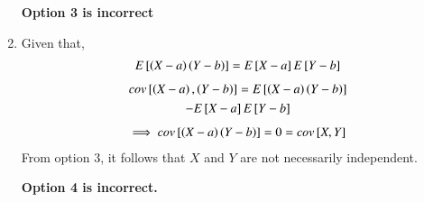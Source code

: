 \documentclass[journal,12pt,twocolumn]{IEEEtran}
\begin{document}
\begin{enumerate}
    \textbf{Option 3 is incorrect}
    
    \item Given that,
    \begin{align}
        E{}\left[\left(X-a\right)\left(Y-b\right)\right]=E{}\left[X-a\right]E{}\left[Y-b\right]
    \end{align}
    \begin{multline}
        cov{}\left[\left(X-a\right),\left(Y-b\right)\right]=
        E{}\left[\left(X-a\right)\left(Y-b\right)\right]\\-E{}\left[X-a\right]E{}\left[Y-b\right]
    \end{multline}
    \begin{align}
        \implies cov{}\left[\left(X-a\right)\left(Y-b\right)\right]=0=cov{}\left[X,Y\right]
    \end{align}
    From option 3, it follows that $X$ and $Y$ are not necessarily independent.
    
    \textbf{Option 4 is incorrect.}

\end{enumerate}
\end{document}
